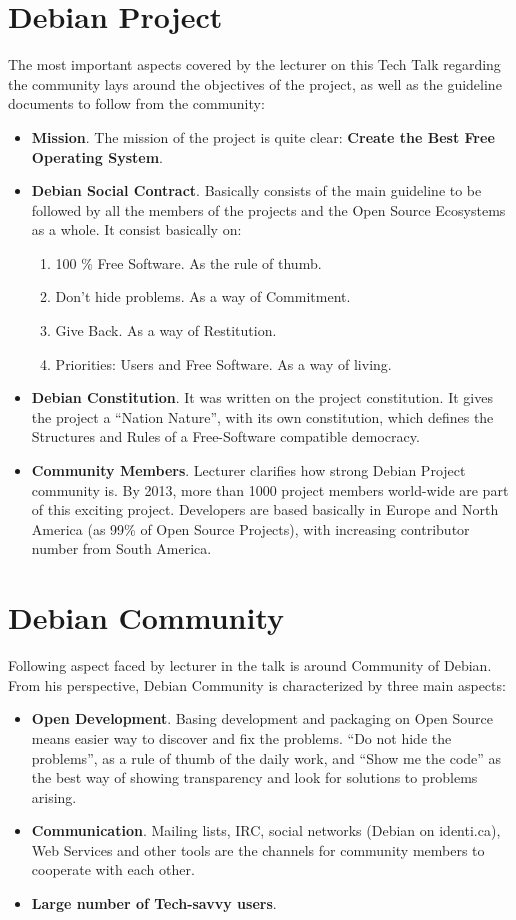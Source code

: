 \documentclass[11pt]{article}
\begin{document}
\section{Debian Project}
The most important aspects covered by the lecturer on this Tech Talk regarding the community lays around the objectives of the project, as well as the guideline documents to follow from the community:
\begin{itemize}
\item{\textbf{Mission}}. The mission of the project is quite clear: \textbf{Create the Best Free Operating System}.
\item{\textbf{Debian Social Contract}}. Basically consists of the main guideline to be followed by all the members of the projects and the Open Source Ecosystems as a whole. It consist basically on:
\begin{enumerate}\itemsep0pt
\item{100 \% Free Software}. As the rule of thumb.
\item{Don't hide problems}. As a way of Commitment.
\item{Give Back}. As a way of Restitution.
\item{Priorities: Users and Free Software}. As a way of living.
\end{enumerate}
\item{\textbf{Debian Constitution}}. It was written on the project constitution. It gives the project a ``Nation Nature'', with its own constitution, which defines the Structures and Rules of a Free-Software compatible democracy.
\item{\textbf{Community Members}}. Lecturer clarifies how strong Debian Project community is. By 2013, more than 1000 project members world-wide are part of this exciting project. Developers are based basically in Europe and North America (as 99\% of Open Source Projects), with increasing contributor number from South America. 
\end{itemize}

\section{Debian Community}
Following aspect faced by lecturer in the talk is around Community of Debian. From his perspective, Debian Community is characterized by three main aspects:
\begin{itemize}
\item{\textbf{Open Development}}. Basing development and packaging on Open Source means easier way to discover and fix the problems. ``Do not hide the problems'', as a rule of thumb of the daily work, and ``Show me the code'' as the best way of showing transparency and look for solutions to problems arising.
\item{\textbf{Communication}}. Mailing lists, IRC, social networks (Debian on identi.ca), Web Services and other tools are the channels for community members to cooperate with each other.
\item{\textbf{Large number of Tech-savvy users}}. 
\end{itemize}
\end{document}
